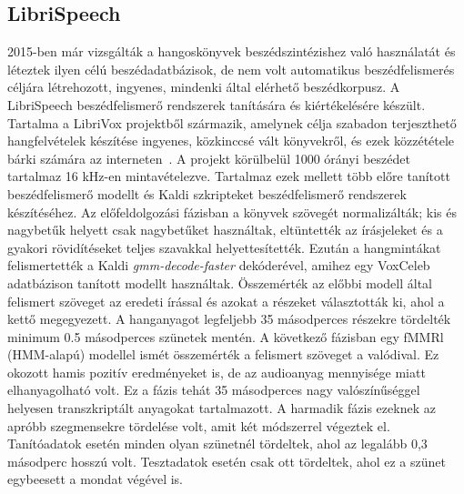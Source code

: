 \subsection{LibriSpeech}

2015-ben már vizsgálták a hangoskönyvek beszédszintézishez való használatát és léteztek ilyen célú beszédadatbázisok, de nem volt automatikus beszédfelismerés céljára létrehozott, ingyenes, mindenki által elérhető beszédkorpusz. A LibriSpeech beszédfelismerő rendszerek tanítására és kiértékelésére készült. Tartalma a LibriVox projektből származik, amelynek célja szabadon terjeszthető hangfelvételek készítése ingyenes, közkinccsé vált könyvekről, és ezek közzététele bárki számára az interneten~\cite{librispeech}.
\newline
\newline
A projekt körülbelül 1000 órányi beszédet tartalmaz 16 kHz-en mintavételezve. Tartalmaz ezek mellett több előre tanított beszédfelismerő modellt és Kaldi szkripteket beszédfelismerő rendszerek készítéséhez.
\newline
\newline
Az előfeldolgozási fázisban a könyvek szövegét normalizálták; kis és nagybetűk helyett csak nagybetűket használtak, eltüntették az írásjeleket és a gyakori rövidítéseket teljes szavakkal helyettesítették. Ezután a hangmintákat felismertették a Kaldi \emph{gmm-decode-faster} dekóderével, amihez egy VoxCeleb adatbázison tanított modellt használtak.
\newline
\newline
Összemérték az előbbi modell által felismert szöveget az eredeti írással és azokat a részeket választották ki, ahol a kettő megegyezett. A hanganyagot legfeljebb 35 másodperces részekre tördelték minimum 0.5 másodperces szünetek mentén.
\newline
\newline
A következő fázisban egy fMMRl (HMM-alapú) modellel ismét összemérték a felismert szöveget a valódival. Ez okozott hamis pozitív eredményeket is, de az audioanyag mennyisége miatt elhanyagolható volt. Ez a fázis tehát 35 másodperces nagy valószínűséggel helyesen transzkriptált anyagokat tartalmazott.
\newline
\newline
A harmadik fázis ezeknek az apróbb szegmensekre tördelése volt, amit két módszerrel végeztek el. Tanítóadatok esetén minden olyan szünetnél tördeltek, ahol az legalább 0,3 másodperc hosszú volt. Tesztadatok esetén csak ott tördeltek, ahol ez a szünet egybeesett a mondat végével is.

